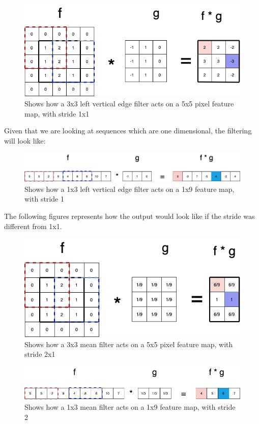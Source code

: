 \begin{figure}[!ht]
  \centering
  \includegraphics[scale=0.4]{latex/imgs/conv1_highVert_stride.png}
  \caption{Shows how a 3x3 left vertical edge filter acts on a 5x5 pixel feature map, with stride 1x1}\label{Baseline:before}
  \label{fig:conv2}
\end{figure}

\noindent
Given that we are looking at sequences which are one dimensional, the filtering will look like:

\begin{figure}[!ht]
  \centering
  \includegraphics[scale=0.4]{latex/imgs/conv2_vert_stride.png}
  \caption{Shows how a 1x3 left vertical edge filter acts on a 1x9 feature map, with stride 1}\label{Baseline:before}
  \label{fig:conv1}
\end{figure}

\noindent
The following figures represents how the output would look like if the stride was different from 1x1.

\begin{figure}[!ht]
  \centering
  \includegraphics[scale=0.4]{latex/imgs/conv1_stride.png}
  \caption{Shows how a 3x3 mean filter acts on a 5x5 pixel feature map, with stride 2x1}\label{Baseline:before}
  \label{fig:2d_stride}
\end{figure}

\begin{figure}[!ht]
  \centering
  \includegraphics[scale=0.4]{latex/imgs/conv2_stride.png}
  \caption{Shows how a 1x3 mean filter acts on a 1x9 feature map, with stride 2}\label{Baseline:before}
  \label{fig:1d_stride}
\end{figure}
